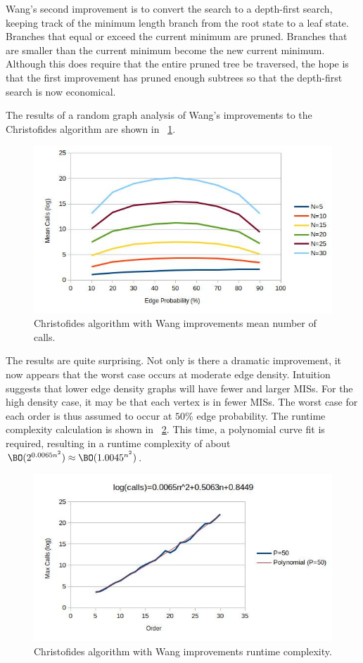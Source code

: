 Wang's second improvement is to convert the search to a depth-first search, keeping track of the minimum length
branch from the root state to a leaf state.  Branches that equal or exceed the current minimum are pruned.
Branches that are smaller than the current minimum become the new current minimum.  Although this does require that
the entire pruned tree be traversed, the hope is that the first improvement has pruned enough subtrees so that the
depth-first search is now economical.

The results of a random graph analysis of Wang's improvements to the Christofides algorithm are shown in
\figurename~\ref{fig:wangcalls}.

\begin{figure}[H]
  \centering
  \includegraphics[width=5in]{wang_calls}
  \caption{Christofides algorithm with Wang improvements mean number of calls.}
  \label{fig:wangcalls}
\end{figure}

The results are quite surprising.  Not only is there a dramatic improvement, it now appears that the worst case
occurs at moderate edge density.  Intuition suggests that lower edge density graphs will have fewer and larger
MISs.  For the high density case, it may be that each vertex is in fewer MISs.  The worst case for each order is
thus assumed to occur at \(50\%\) edge probability.  The runtime complexity calculation is shown in
\figurename~\ref{fig:wangruntime}.  This time, a polynomial curve fit is required, resulting in a runtime
complexity of about \(\BO(2^{0.0065n^2})\approx\BO(1.0045^{n^2})\).

\begin{figure}[H]
  \centering
  \includegraphics[width=5in]{wang_runtime}
  \caption{Christofides algorithm with Wang improvements runtime complexity.}
  \label{fig:wangruntime}
\end{figure}

